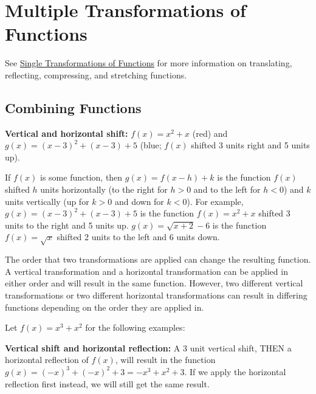 \section{Multiple Transformations of Functions}
\label{sec:mult-9f5c}
See \href{https://mathresearch.utsa.edu/alice/src/Pagina.aspx?pagina=25\&opus=1073\&lng=BRITANNIA}{Single Transformations of Functions} for more information on translating, reflecting, compressing, and stretching functions.

\subsection{Combining Functions}
\label{sss:comb-7f72}

\textbf{Vertical and horizontal shift:} $f(x) = x^2 + x$ (red) and $g(x) = (x - 3)^2 + (x - 3) + 5$ (blue; $f(x)$ shifted 3 units right and 5 units up).

If $f(x)$ is some function, then $g(x) = f(x - h) + k$ is the function $f(x)$ shifted $h$ units horizontally (to the right for $h > 0$ and to the left for $h < 0$) and $k$ units vertically (up for $k > 0$ and down for $k < 0$). For example, $g(x) = (x - 3)^2 + (x - 3) + 5$ is the function $f(x) = x^2 + x$ shifted 3 units to the right and 5 units up. $g(x) = \sqrt{x + 2} - 6$ is the function $f(x) = \sqrt{x}$ shifted 2 units to the left and 6 units down.

The order that two transformations are applied can change the resulting function. A
vertical transformation and a horizontal transformation can be applied in either order and
will result in the same function. However, two different vertical transformations or two
different horizontal transformations can result in differing functions depending on the
order they are applied in.

Let $f(x) = x^3 + x^2$ for the following examples:

\textbf{Vertical shift and horizontal reflection:} A 3 unit vertical shift, THEN a horizontal reflection of $f(x)$, will result in the function $g(x) = (-x)^3 + (-x)^2 + 3 = -x^3 + x^2 + 3$. If we apply the horizontal reflection first instead, we will still get the same result.

